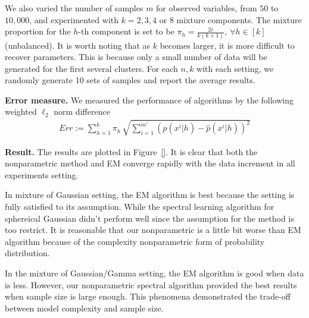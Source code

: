 \documentclass{article}
\newcommand{\Note}[1]{{\color{red}{\bf\sf [note: #1]}}}
\begin{document}
We also varied the number of samples $m$ for observed variables, from $50$ to $10,000$, and
experimented with $k=2,3,4$ or $8$ mixture components. The mixture proportion for the $h$-th component is set to be $\pi_h= \frac{2i}{k(k+1)},~\forall h\in[k]$ (unbalanced). It is worth noting that as $k$ becomes larger, it is more difficult to recover parameters. This is because only a small number of data will be generated for the first several clusters. For each $n,k$ with each setting, we randomly generate 10 sets of samples and report the average results.

{\bf Error measure.} We measured the performance of algorithms by the
following weighted $\ell_2$ norm difference
\begin{align*}
  Err:=\sum_{h=1}^{k} \pi_h\, \sqrt{\sum_{i=1}^{m'} (p(x^i|h) - \widehat{p}(x^i|h))^2 }
\end{align*}

{\bf Result.} The results are plotted in Figure~\ref{}. It is clear that both the nonparametric method and EM converge rapidly with the data increment in all experiments setting.

In mixture of Gaussian setting, the EM algorithm is best because the setting is fully satisfied to its assumption. While the spectral learning algorithm for sphereical Gaussian didn't perform well since the assumption for the method is too restrict. It is reasonable that our nonparametric is a little bit worse than EM algorithm because of the complexity nonparametric form of probability distribution.

In the mixture of Gaussian/Gamma setting, the EM algorithm is good when data is less. However, our nonparametric spectral algorithm provided the best results when sample size is large enough. This phenomena demonstrated the trade-off between model complexity and sample size.

\Note{result description needs refinement. report results case of the 4 experimental setting. Enumerate item by item.}





\end{document}
